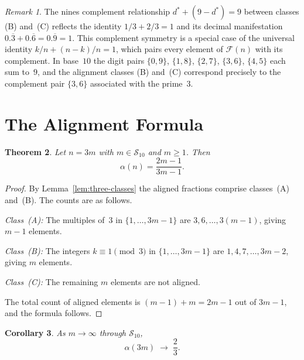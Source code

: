 \documentclass[12pt]{amsart}
\newtheorem{theorem}{Theorem}
\newtheorem{corollary}[theorem]{Corollary}
\theoremstyle{definition}
\theoremstyle{remark}
\newtheorem{remark}[theorem]{Remark}
\begin{document}
\begin{remark}
The nines complement relationship $d^{*} + (9 - d^{*}) = 9$ between
classes (B) and~(C) reflects the identity $1/3 + 2/3 = 1$ and its
decimal manifestation $0.\overline{3} + 0.\overline{6} = 0.\overline{9}
= 1$. This complement symmetry is a special case of the universal
identity $k/n + (n{-}k)/n = 1$, which pairs every element of
$\mathcal{F}(n)$ with its complement. In base~$10$ the digit pairs
$\{0,9\}$, $\{1,8\}$, $\{2,7\}$, $\{3,6\}$, $\{4,5\}$ each sum
to~$9$, and the alignment classes (B) and~(C) correspond precisely to
the complement pair $\{3,6\}$ associated with the prime~$3$.
\end{remark}

\section{The Alignment Formula}

\begin{theorem}\label{thm:alignment}
Let $n = 3m$ with $m \in \mathcal{S}_{10}$ and $m \ge 1$. Then
\[
\alpha(n) = \frac{2m-1}{3m-1}.
\]
\end{theorem}

\begin{proof}
By Lemma~\ref{lem:three-classes} the aligned fractions comprise
classes~(A) and~(B). The counts are as follows.

\smallskip

\emph{Class~(A):} The multiples of~$3$ in $\{1,\ldots,3m{-}1\}$ are
$3, 6, \ldots, 3(m{-}1)$, giving $m-1$ elements.

\smallskip

\emph{Class~(B):} The integers $k \equiv 1 \pmod{3}$ in
$\{1,\ldots,3m{-}1\}$ are $1, 4, 7, \ldots, 3m{-}2$, giving $m$
elements.

\smallskip

\emph{Class~(C):} The remaining $m$ elements are not aligned.

\smallskip

The total count of aligned elements is $(m{-}1) + m = 2m - 1$ out of
$3m - 1$, and the formula follows.
\end{proof}

\begin{corollary}\label{cor:limit}
As $m \to \infty$ through $\mathcal{S}_{10}$,
\[
\alpha(3m) \;\longrightarrow\; \frac{2}{3}.
\]
\end{corollary}
\end{document}
